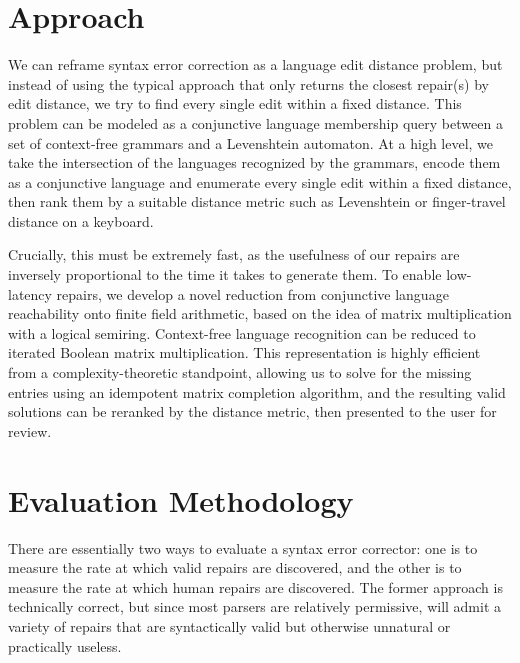 \documentclass[sigplan,screen]{acmart}
\begin{document}
\section{Approach}


We can reframe syntax error correction as a language edit distance problem, but instead of using the typical approach that only returns the closest repair(s) by edit distance, we try to find every single edit within a fixed distance. This problem can be modeled as a conjunctive language membership query between a set of context-free grammars and a Levenshtein automaton. At a high level, we take the intersection of the languages recognized by the grammars, encode them as a conjunctive language and enumerate every single edit within a fixed distance, then rank them by a suitable distance metric such as Levenshtein or finger-travel distance on a keyboard.

Crucially, this must be extremely fast, as the usefulness of our repairs are inversely proportional to the time it takes to generate them. To enable low-latency repairs, we develop a novel reduction from conjunctive language reachability onto finite field arithmetic, based on the idea of matrix multiplication with a logical semiring. Context-free language recognition can be reduced to iterated Boolean matrix multiplication. This representation is highly efficient from a complexity-theoretic standpoint, allowing us to solve for the missing entries using an idempotent matrix completion algorithm, and the resulting valid solutions can be reranked by the distance metric, then presented to the user for review.

\section{Evaluation Methodology}


There are essentially two ways to evaluate a syntax error corrector: one is to measure the rate at which valid repairs are discovered, and the other is to measure the rate at which human repairs are discovered. The former approach is technically correct, but since most parsers are relatively permissive, will admit a variety of repairs that are syntactically valid but otherwise unnatural or practically useless.
\end{document}
